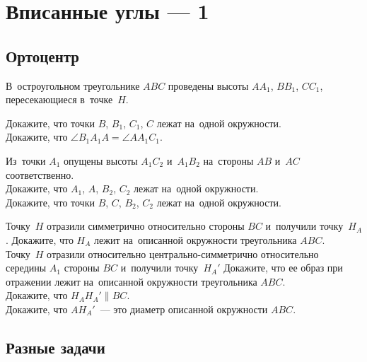
\section*{Вписанные углы --- 1}

\subsection*{Ортоцентр}

В~остроугольном треугольнике $ABC$ проведены высоты $A A_1$, $B B_1$, $C C_1$,
пересекающиеся в~точке~$H$.

\begin{problems}

\item
\subproblem
Докажите, что точки $B$, $B_1$, $C_1$, $C$ лежат на~одной окружности.
\\
\subproblem
Докажите, что $\angle B_1 A_1 A = \angle A A_1 C_1$.

\item
Из~точки $A_1$ опущены высоты $A_1 C_2$ и~$A_1 B_2$ на~стороны $AB$ и~$AC$
соответственно.
\\
\subproblem
Докажите, что $A_1$, $A$, $B_2$, $C_2$ лежат на~одной окружности.
\\
\subproblem
Докажите, что точки $B$, $C$, $B_2$, $C_2$ лежат на~одной окружности.

\item
\subproblem
Точку~$H$ отразили симметрично относительно стороны $BC$ и~получили
точку~$H_{A}$.
Докажите, что $H_{A}$ лежит на~описанной окружности треугольника $ABC$.
\\
\subproblem
Точку~$H$ отразили относительно центрально-симметрично относительно середины
$A_1$ стороны $BC$ и~получили точку~$H_{A}'$
Докажите, что ее образ при отражении лежит на~описанной окружности
треугольника $ABC$.
\\
\subproblem
Докажите, что $H_{A} H_{A}' \parallel BC$.
\\
\subproblem
Докажите, что $A H_{A}'$~--- это диаметр описанной окружности $ABC$.

\end{problems}

\subsection*{Разные задачи}

